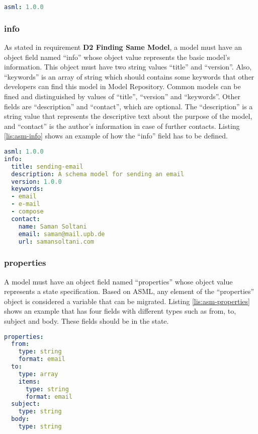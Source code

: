 \lstset{
  label=lis:asm-asml, caption=Application State Model “asml” field example., 
}
\begin{lstlisting}[language=yaml]
asml: 1.0.0
\end{lstlisting}
\subsubsection{info}
As stated in requirement \textbf{D2 Finding Same Model}, a model must have an object field named “info” whose object value represents the basic model’s information. This object must have two string values “title” and “version”. Also, “keywords” is an array of string which should contains some keywords that other developers can find this model in Model Repository. Common models can be fined and distinguished by values of “title”, “version” and “keywords”. Other fields are “description” and “contact”, which are optional. The “description” is a string value that represents the descriptive text about the purpose of the model, and “contact” is the author’s information in case of further contacts. Listing \ref{lis:asm-info} shows an example of how the “info” field has to be defined.

\lstset{
  label=lis:asm-info, caption=Application State Model “info” field example. 
}
\begin{lstlisting}[language=yaml]
asml: 1.0.0
info:
  title: sending-email
  description: A schema model for sending an email
  version: 1.0.0
  keywords:
  - email
  - e-mail
  - compose  
  contact:
    name: Saman Soltani
    email: saman@mail.upb.de
    url: samansoltani.com
\end{lstlisting}

\subsubsection{properties}
A model must have an object field named “properties” whose object value represents a state specification. Based on ASML, any element of the “properties” object is considered a variable that can be migrated.
Listing \ref{lis:asm-properties} shows an example that has four fields with different types such as from, to, subject and body. These fields should be in the state.

\lstset{
  label=lis:asm-properties, caption=Application State Model “properties” field example.
}
\begin{lstlisting}[language=yaml]
properties:
  from:
    type: string
    format: email
  to:
    type: array
    items:
      type: string
      format: email
  subject:
    type: string
  body:
    type: string

\end{lstlisting}
